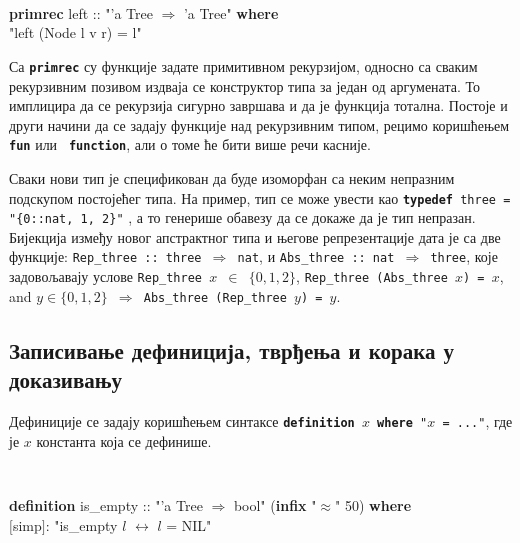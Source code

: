 \begin{small}
{\tt
  \begin{tabbing}
    \textbf{prim}\=\textbf{rec} left :: "'a Tree $\Rightarrow$ 'a Tree" \textbf{where} \\
                 \>"left (Node l v r) = l"
  \end{tabbing}
}
\end{small}

Са {\tt \textbf{primrec}} су функције задате примитивном рекурзијом,
односно са сваким рекурзивним позивом издваја се конструктор типа за
један од аргумената. То имплицира да се рекурзија сигурно завршава и
да је функција тотална. Постоје и други начини да се задају функције
над рекурзивним типом, рецимо коришћењем {\tt \textbf{fun}} или {\tt
  \textbf{function}}, али о томе ће бити више речи касније.

Сваки нови тип је спецификован да буде изоморфан са неким непразним
подскупом постојећег типа. На пример, тип се може увести као
 {\tt \textbf{typedef} three = "\{0::nat, 1,
  2\}"} , а то генерише обавезу да се докаже
да је тип непразан. Бијекција између новог апстрактног типа и његове
репрезентације дата је са две функције: {\tt Rep\_three :: three
  $\Longrightarrow$ nat}, и {\tt Abs\_three :: nat $\Longrightarrow$
  three}, које задовољавају услове {\tt Rep\_three $x$ $\in$ $\{0, 1,
  2\}$}, {\tt Rep\_three (Abs\_three $x$) = $x$}, and {\tt $y \in \{0,
  1, 2\}$ $\Longrightarrow$ Abs\_three (Rep\_three $y$) = $y$}.


\subsection{Записивање дефиниција, тврђења и корака у доказивању}

 Дефиниције се задају коришћењем синтаксе {\tt \textbf{definition} $x$
   \textbf{where} "$x$ = ..."}, где је $x$ константа која се дефинише.

\begin{small}
{\tt
  \begin{tabbing}
    \textbf{definition} is\_empty :: "'a Tree $\Rightarrow$ bool" (\textbf{infix} "$\approx$" 50) \textbf{where} \\
    $[$simp$]$: "is\_empty $l$ $\longleftrightarrow$ $l$ = NIL" 
  \end{tabbing}
}
\end{small}

